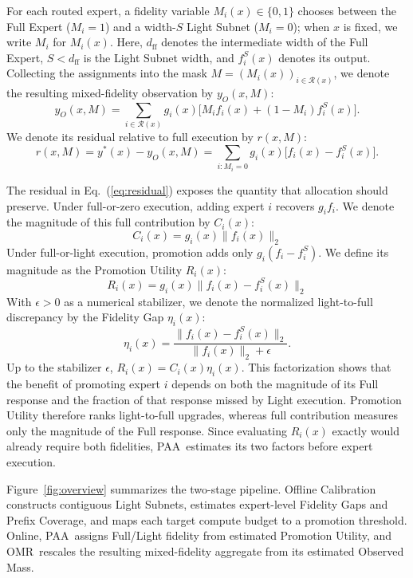 \documentclass{article}
\newcommand{\PAA}{\textsc{PAA}}
\newcommand{\OMR}{\textsc{OMR}}
\newcommand{\Rset}{\mathcal{R}}
\begin{document}
For each routed expert, a fidelity variable $M_i(x)\in\{0,1\}$ chooses between the Full Expert ($M_i=1$) and a width-$S$ Light Subnet ($M_i=0$); when $x$ is fixed, we write $M_i$ for $M_i(x)$. Here, $d_{\mathrm{ff}}$ denotes the intermediate width of the Full Expert, $S<d_{\mathrm{ff}}$ is the Light Subnet width, and $f_i^S(x)$ denotes its output. Collecting the assignments into the mask $M=(M_i(x))_{i\in\Rset(x)}$, we denote the resulting mixed-fidelity observation by $y_O(x,M)$:
\begin{equation}
  y_O(x,M)=\sum_{i\in\Rset(x)} g_i(x)\big[M_i f_i(x)+(1-M_i)f_i^S(x)\big].
  \label{eq:observed-output}
\end{equation}
We denote its residual relative to full execution by $r(x,M)$:
\begin{equation}
  r(x,M)=y^*(x)-y_O(x,M)
  =\sum_{i:M_i=0}g_i(x)\big[f_i(x)-f_i^S(x)\big].
  \label{eq:residual}
\end{equation}

The residual in Eq.~(\ref{eq:residual}) exposes the quantity that allocation should preserve. Under full-or-zero execution, adding expert $i$ recovers $g_i f_i$. We denote the magnitude of this full contribution by $C_i(x)$:
\begin{equation}
  C_i(x)=g_i(x)\lVert f_i(x)\rVert_2
\end{equation}
Under full-or-light execution, promotion adds only $g_i(f_i-f_i^S)$. We define its magnitude as the Promotion Utility $R_i(x)$:
\begin{equation}
  R_i(x)=g_i(x)\lVert f_i(x)-f_i^S(x)\rVert_2
  \label{eq:promotion-utility}
\end{equation}
With $\epsilon>0$ as a numerical stabilizer, we denote the normalized light-to-full discrepancy by the Fidelity Gap $\eta_i(x)$:
\begin{equation}
  \eta_i(x)=\frac{\lVert f_i(x)-f_i^S(x)\rVert_2}{\lVert f_i(x)\rVert_2+\epsilon}.
  \label{eq:fidelity-gap}
\end{equation}
Up to the stabilizer $\epsilon$, $R_i(x)=C_i(x)\eta_i(x)$. This factorization shows that the benefit of promoting expert $i$ depends on both the magnitude of its Full response and the fraction of that response missed by Light execution. Promotion Utility therefore ranks light-to-full upgrades, whereas full contribution measures only the magnitude of the Full response. Since evaluating $R_i(x)$ exactly would already require both fidelities, \PAA\ estimates its two factors before expert execution.

Figure~\ref{fig:overview} summarizes the two-stage pipeline. Offline Calibration constructs contiguous Light Subnets, estimates expert-level Fidelity Gaps and Prefix Coverage, and maps each target compute budget to a promotion threshold. Online, \PAA\ assigns Full/Light fidelity from estimated Promotion Utility, and \OMR\ rescales the resulting mixed-fidelity aggregate from its estimated Observed Mass.
\end{document}
